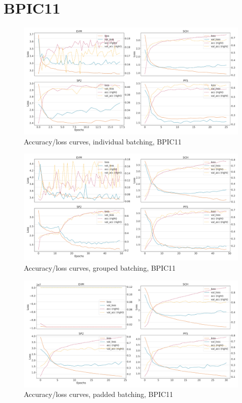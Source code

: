 \section*{BPIC11}
\begin{figure}[!htb]
    \centering
    \includegraphics[width=\textwidth]{gfx/bpic2011/individual_loss_acc_curve.pdf}
    \caption{Accuracy/loss curves, individual batching, BPIC11}
\end{figure}
\begin{figure}[!htb]
    \centering
    \includegraphics[width=\textwidth]{gfx/bpic2011/grouped_loss_acc_curve.pdf}
    \caption{Accuracy/loss curves, grouped batching, BPIC11}
\end{figure}
\begin{figure}[!htb]
    \centering
    \includegraphics[width=\textwidth]{gfx/bpic2011/padded_loss_acc_curve.pdf}
    \caption{Accuracy/loss curves, padded batching, BPIC11}
\end{figure}
